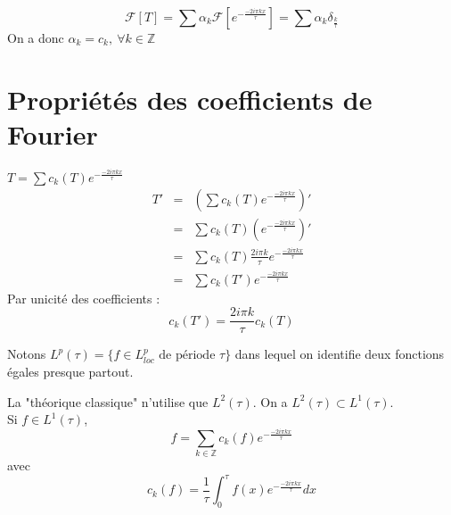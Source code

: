 \documentclass{article}
\begin{document}
\begin{dem}
	\[\mathcal{F}[T]=\sum \alpha_k \mathcal{F}[e^{-\frac{-2i\pi kx}{\tau}}] = \sum \alpha_k \delta_{\frac{k}{\tau}}\]
	On a donc $\alpha_k = c_k,\ \forall k\in\mathbb{Z}$
\end{dem}

\section{Propriétés des coefficients de Fourier}

\begin{dem}
	$T=\sum c_k(T) e^{-\frac{-2i\pi kx}{\tau}}$ 
	\begin{eqnarray*}
		T'&=& \left( \sum c_k(T) e^{-\frac{-2i\pi kx}{\tau}} \right) ' \\
		  &=& \sum c_k(T) \left( e^{-\frac{-2i\pi kx}{\tau}} \right) ' \\
		  &=& \sum c_k(T) \frac{2i\pi k}{\tau} e^{-\frac{-2i\pi kx}{\tau}} \\
		  &=& \sum c_k(T') e^{-\frac{-2i\pi kx}{\tau}}
	\end{eqnarray*}
	Par unicité des coefficients : \[c_k(T')=\frac{2i\pi k}{\tau} c_k(T)\]
\end{dem}


Notons $L^p(\tau)=\{f\in L^p_{loc} \text{ de période } \tau\}$ dans lequel on identifie deux fonctions égales presque partout.

\bigskip
La "théorique classique" n'utilise que $L^2(\tau)$. On a $L^2(\tau)\subset L^1(\tau)$.\\
Si $f\in L^1(\tau)$, \[f=\sum_{k\in\mathbb{Z}} c_k(f) e^{-\frac{-2i\pi kx}{\tau}}\] avec \[c_k(f)=\frac{1}{\tau} \int_0^{\tau} f(x) e^{-\frac{-2i\pi kx}{\tau}} dx\]
\end{document}
